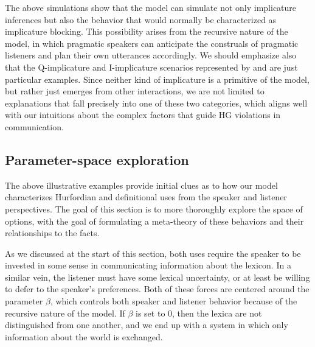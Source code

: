 \documentclass[12pt,twoside]{article}
\renewcommand{\_}{\textbf{\textunderscore\hspace{-4pt}\textunderscore\hspace{-3pt}\textunderscore\hspace{-4pt}\textunderscore}\hspace{0.5pt}}			%
\begin{document}
The above simulations show that the model can simulate not only
implicature inferences but also the behavior that would normally be
characterized as implicature blocking. This possibility arises from
the recursive nature of the model, in which pragmatic speakers can
anticipate the construals of pragmatic listeners and plan their own
utterances accordingly. We should emphasize also that the
Q-implicature and I-implicature scenarios represented by
 and  are just particular
examples. Since neither kind of implicature is a primitive of the
model, but rather just emerges from other interactions, we are not
limited to explanations that fall precisely into one of these two
categories, which aligns well with our intuitions about the complex
factors that guide HG violations in communication.


\subsection{Parameter-space exploration}\label{sec:characterization}

The above illustrative examples provide initial clues as to how our
model characterizes Hurfordian and definitional uses from the speaker
and listener perspectives. The goal of this section is to more
thoroughly explore the space of options, with the goal of formulating
a meta-theory of these behaviors and their relationships to the facts.

As we discussed at the start of this section, both uses require the
speaker to be invested in some sense in communicating information
about the lexicon.  In a similar vein, the listener must have some
lexical uncertainty, or at least be willing to defer to the speaker's
preferences. Both of these forces are centered around the parameter
$\beta$, which controls both speaker and listener behavior because of
the recursive nature of the model. If $\beta$ is set to $0$, then the
lexica are not distinguished from one another, and we end up with a
system in which only information about the world is exchanged.
\end{document}
